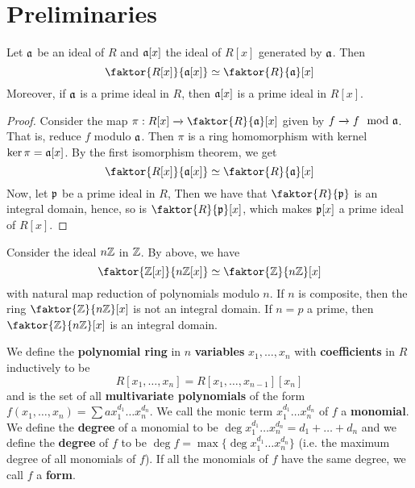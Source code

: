 \section{Preliminaries}

\begin{theorem}\label{1.1.1}
    Let $\mathfrak{a}$ be an ideal of  $R$ and $\mathfrak{a}[x]$ the ideal of $R[x]$ generated by
    $\mathfrak{a}$. Then
    \begin{equation*}
        \faktor{R[x]}{\af[x]} \simeq \faktor{R}{\af}[x]
    \end{equation*}
    Moreover, if $\mathfrak{a}$ is a prime ideal in $R$, then $\mathfrak{a}[x]$ is a prime ideal in
    $R[x]$.
\end{theorem}
\begin{proof}
    Consider the map $\pi:R[x] \xrightarrow{} \faktor{R}{\af}[x]$ given by $f
    \xrightarrow{} f \mod{\mathfrak{a}}$. That is, reduce $f$ modulo  $\mathfrak{a}$.  Then $\pi$ is a
    ring homomorphism with kernel $\ker{\pi}=\mathfrak{a}[x]$. By the first isomorphism
    theorem, we get
    \begin{equation*}
        \faktor{R[x]}{\af[x]} \simeq \faktor{R}{\af}[x]
    \end{equation*}
    Now, let $\mathfrak{p}$ be a prime ideal in $R$, Then we have that $\faktor{R}{\pf}$ is
    an integral domain, hence, so is $\faktor{R}{\pf}[x]$, which makes $\mathfrak{p}[x]$ a
    prime ideal of $R[x]$.
\end{proof}

\begin{example}\label{example_1.1}
    Consider the ideal $n\mathbb{Z}$ in  $\mathbb{Z}$. By above, we have
    \begin{equation*}
        \faktor{\Z[x]}{n\Z[x]} \simeq \faktor{\Z}{n\Z}[x]
    \end{equation*}
    with natural map reduction of polynomials modulo $n$. If $n$ is composite,
    then the ring $\faktor{\Z}{n\Z}[x]$ is not an integral domain. If $n=p$ a
    prime, then  $\faktor{\Z}{n\Z}[x]$ is an integral domain.
\end{example}

\begin{definition}
    We define the \textbf{polynomial ring} in $n$  \textbf{variables} $x_1,
    \dots, x_n$ with \textbf{coefficients} in $R$ inductively to be
    \begin{equation*}
        R[x_1, \dots, x_n]=R[x_1, \dots, x_{n-1}][x_n]
    \end{equation*}
    and is the set of all \textbf{multivariate polynomials} of the form $f(x_1,
    \dots,x_n)=\sum{ax_1^{d_1} \dots x_n^{d_n}}$. We call the monic term
    $x_1^{d_1} \dots x_n^{d_n}$ of $f$ a  \textbf{monomial}. We define the
    \textbf{degree} of a monomial to be $\deg{x_1^{d_1} \dots
    x_n^{d_n}}=d_1+\dots+d_n$ and we define the \textbf{degree} of $f$ to be
    $\deg{f}=\max{\{\deg{x_1^{d_1} \dots x_n^{d_n}}\}}$ (i.e. the maximum degree
    of all monomials of $f$). If all the monomials of $f$ have the same degree,
    we call  $f$ a \textbf{form}.
\end{definition}

